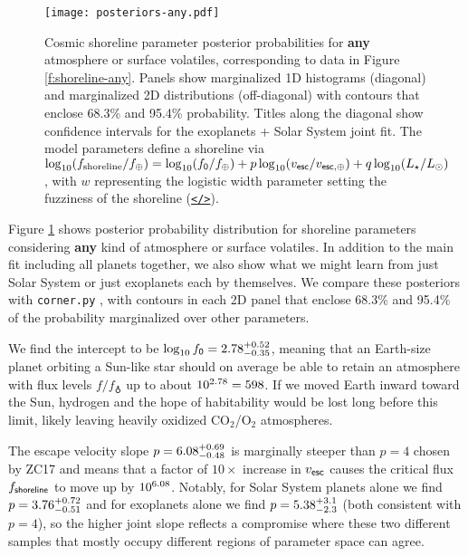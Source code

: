 \documentclass[modern,linenumbers,trackchanges]{aastex7}
\begin{document}
\begin{figure*}[ht!]
\texttt{[image: posteriors-any.pdf]}
\caption{Cosmic shoreline parameter posterior probabilities for {\bf any} atmosphere or surface volatiles, corresponding to data in Figure \ref{f:shoreline-any}. Panels show marginalized 1D histograms (diagonal) and marginalized 2D distributions (off-diagonal) with contours that enclose 68.3\% and 95.4\% probability. Titles along the diagonal show confidence intervals for the exoplanets + Solar System joint fit. The model parameters define a shoreline via $\log_{10} (f_{\rm shoreline}/f_\oplus) = \log_{10} (f_{\sf 0}/f_\oplus) + p \log_{10} (v_{\sf esc}/v_{\sf esc, \oplus}) + q \log_{10} (L_\star/L_\odot)$, with $w$ representing the logistic width parameter setting the fuzziness of the shoreline  (\href{https://github.com/zkbt/shoreline/blob/main/notebooks/print-and-visualize-posteriors.ipynb}{\texttt{</>}}).}
\label{f:posteriors-any}
\end{figure*}

Figure \ref{f:posteriors-any} shows posterior probability distribution for shoreline parameters considering {\bf any} kind of atmosphere or surface volatiles. In addition to the main fit including all planets together, we also show what we might learn from just Solar System or just exoplanets each by themselves. We compare these posteriors with \texttt{corner.py} \citep{foreman-mackeyCornerpyScatterplotMatrices2016}, with contours in each 2D panel that enclose 68.3\% and 95.4\% of the probability marginalized over other parameters. 

We find the intercept to be $\log_{10}{f_{\sf 0}} = 2.78_{-0.35}^{+0.52}$, meaning that an Earth-size planet orbiting a Sun-like star should on average be able to retain an atmosphere with flux levels $f/f_\earth$ up to about $10^{2.78} = 598$. If we moved Earth inward toward the Sun, hydrogen and the hope of habitability would be lost long before this limit, likely leaving heavily oxidized CO$_2$/O$_2$ atmospheres.

The escape velocity slope $p = 6.08_{-0.48}^{+0.69}$ is marginally steeper than $p=4$ chosen by ZC17 and means that a factor of $10\times$ increase in $v_{\sf esc}$ causes the critical flux $f_{\sf shoreline}$ to move up by $10^{6.08}$. Notably, for Solar System planets alone we find $p = 3.76_{-0.51}^{+0.72}$ and for exoplanets alone we find $p = 5.38_{-2.3}^{+3.1}$ (both consistent with $p=4$), so the higher joint slope reflects a compromise where these two different samples that mostly occupy different regions of parameter space can agree.
\end{document}
